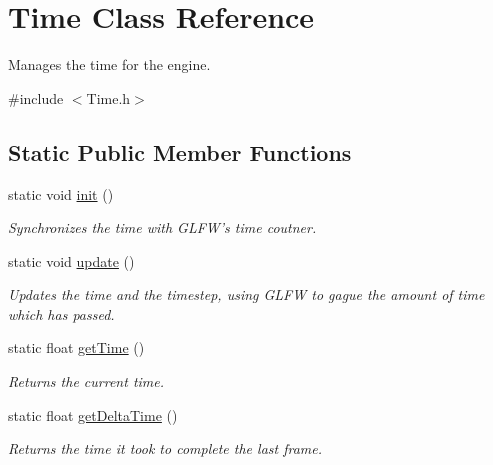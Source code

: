 \hypertarget{class_time}{\section{Time Class Reference}
\label{class_time}
}


Manages the time for the engine.  




{\ttfamily \#include $<$Time.\-h$>$}

\subsection*{Static Public Member Functions}
\begin{DoxyCompactItemize}
\item 
\hypertarget{class_time_ac626e60d7767728dca61c1095cb9678c}{static void \hyperlink{class_time_ac626e60d7767728dca61c1095cb9678c}{init} ()}\label{class_time_ac626e60d7767728dca61c1095cb9678c}

\begin{DoxyCompactList}\small\item\em Synchronizes the time with G\-L\-F\-W's time coutner. \end{DoxyCompactList}\item 
\hypertarget{class_time_a1463d5551f982b457d88b6bd4e077903}{static void \hyperlink{class_time_a1463d5551f982b457d88b6bd4e077903}{update} ()}\label{class_time_a1463d5551f982b457d88b6bd4e077903}

\begin{DoxyCompactList}\small\item\em Updates the time and the timestep, using G\-L\-F\-W to gague the amount of time which has passed. \end{DoxyCompactList}\item 
static float \hyperlink{class_time_ad6773c7a2339b463fc7ea14e31315c89}{get\-Time} ()
\begin{DoxyCompactList}\small\item\em Returns the current time. \end{DoxyCompactList}\item 
static float \hyperlink{class_time_a405c7642c4ba0ee719a8d0491099102a}{get\-Delta\-Time} ()
\begin{DoxyCompactList}\small\item\em Returns the time it took to complete the last frame. \end{DoxyCompactList}\end{DoxyCompactItemize}


